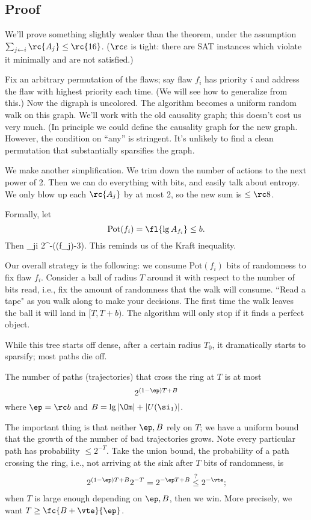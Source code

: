\subsection{Proof}

We'll prove something slightly weaker than the theorem, under the assumption $\sum_{j\leftarrow i}\rc{A_j}\le \rc{16}$. ($\rc e$ is tight: there are SAT instances which violate it minimally and are not satisfied.)

Fix an arbitrary permutation of the flaws; say flaw $f_i$ has priority $i$ and address the flaw with highest priority each time. (We will see how to generalize from this.) Now the digraph is uncolored. The algorithm becomes a uniform random walk on this graph. We'll work with the old causality graph; this doesn't cost us very much. (In principle we could define the causality graph for the new graph. However, the condition on ``any'' is stringent. It's unlikely to find a clean permutation that substantially sparsifies the graph.

We make another simplification. We trim down the number of actions to the next power of 2. Then we can do everything with bits, and easily talk about entropy. We only blow up each $\rc{A_j}$ by at most 2, so the new sum is $\le \rc8$.

Formally, let 
\[\text{Pot}(f_i)=\fl{\lg A_{f_i}}\le b.\]
Then
\sum_{j\leftarrow i} 2^{-((f_j)-3)}.
\eeq
This reminds us of the Kraft inequality.

Our overall strategy is the following: we consume $\text{Pot}(f_i)$ bits of randomness to fix flaw $f_i$. Consider a ball of radius $T$ around it with respect to the number of bits read, i.e., fix the amount of randomness that the walk will consume. ``Read a tape" as you walk along to make your decisions. The first time the walk leaves the ball it will land in $[T,T+b)$. The algorithm will only stop if it finds a perfect object.

While this tree starts off dense, after a certain radius $T_0$, it dramatically starts to sparsify; most paths die off.

\begin{clm}
The number of paths (trajectories) that cross the ring at $T$ is at most
\[
2^{(1-\ep)T+B}
\]
where $\ep=\rc b$ and $B=\lg|\Om|+|U(\si_1)|$.
\end{clm}
The important thing is that neither $\ep,B$ rely on $T$; we have a uniform bound that the growth of the number of bad trajectories grows. 
Note every particular path has probability $\le 2^{-T}$. Take the union bound, the probability of a path crossing the ring, i.e., not arriving at the sink after $T$ bits of randomness, is
\[
2^{(1-\ep)T+B}2^{-T}=2^{-\ep T+B}\stackrel{?}\le 2^{-\vte};
\]
when $T$ is large enough depending on $\ep,B$, then we win. More precisely, we want $T\ge \fc{B+\vte}{\ep}$.

